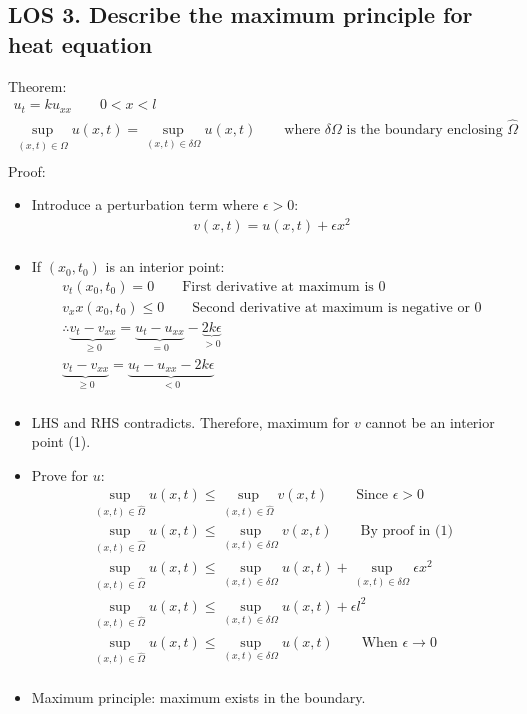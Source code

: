 \documentclass[12pt, a4paper]{article}
\begin{document}
\subsection*{LOS 3. Describe the maximum principle for heat equation}
Theorem:
\begin{gather*}
    u_t = ku_{xx} \qquad 0<x<l\\
    \sup_{(x, t) \in \hat{\Omega}} u(x, t) = \sup_{(x, t) \in \delta \Omega} u(x, t) \qquad \text{where $\delta\Omega$ is the boundary enclosing $\hat{\Omega}$}\\
\end{gather*}
Proof:
\begin{itemize}
    \item Introduce a perturbation term where $\epsilon>0$:
    \begin{gather*}
        v(x, t) = u(x, t) + \epsilon x^2 \\
    \end{gather*}
    \item If $(x_0, t_0)$ is an interior point:
    \begin{gather*}
        v_t(x_0, t_0) = 0 \qquad \text{First derivative at maximum is 0}\\
        v_xx(x_0, t_0) \leq 0 \qquad \text{Second derivative at maximum is negative or 0}\\
        \therefore \underbrace{v_t - v_{xx}}_{\geq 0} = \underbrace{u_t - u_{xx}}_{=0} - \underbrace{2k\epsilon}_{>0}\\
        \underbrace{v_t - v_{xx}}_{\geq 0} = \underbrace{u_t - u_{xx} - 2k\epsilon}_{<0}\\
    \end{gather*}
    \item LHS and RHS contradicts. Therefore, maximum for $v$ cannot be an interior point (1).
    \item Prove for $u$:
    \begin{gather*}
        \sup_{(x, t) \in \hat{\Omega}} u(x, t) \leq \sup_{(x, t) \in \hat{\Omega}} v(x, t) \qquad \text{Since $\epsilon > 0$}\\ 
        \sup_{(x, t) \in \hat{\Omega}} u(x, t) \leq \sup_{(x, t) \in \delta \Omega} v(x, t) \qquad \text{By proof in (1)}\\ 
        \sup_{(x, t) \in \hat{\Omega}} u(x, t) \leq \sup_{(x, t) \in \delta \Omega} u(x, t) + \sup_{(x, t) \in \delta \Omega} \epsilon x^2\\
        \sup_{(x, t) \in \hat{\Omega}} u(x, t) \leq \sup_{(x, t) \in \delta \Omega} u(x, t) + \epsilon l^2\\
        \sup_{(x, t) \in \hat{\Omega}} u(x, t) \leq \sup_{(x, t) \in \delta \Omega} u(x, t) \qquad \text{When $\epsilon \to 0$}\\
    \end{gather*}
    \item Maximum principle: maximum exists in the boundary.\\
\end{itemize}
\end{document}
